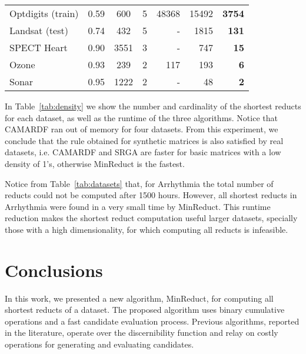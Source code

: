 \documentclass[authoryear,preprint,review,12pt]{elsarticle}
\begin{document}
\begin{table}[tb]
\begin{tabular}{lcccrrr}
			Optdigits (train)& 0.59 & 600  & 5  & 48368         & 15492          & \textbf{3754} \\
			Landsat (test)   & 0.74 & 432  & 5  &   -           & 1815           & \textbf{131}   \\
			SPECT Heart      & 0.90 & 3551 & 3  &  -            & 747            & \textbf{15}   \\
			Ozone            & 0.93 & 239  & 2  & 117           & 193            & \textbf{6}   \\
			Sonar            & 0.95 & 1222 & 2  &  -            & 48             & \textbf{2}   \\
			\hline
		\end{tabular}
	\end{table} 

	In Table~\ref{tab:density} we show the number and cardinality of the shortest reducts for each dataset, as well as the runtime of the three algorithms. Notice that CAMARDF ran out of memory for four datasets. From this experiment, we conclude that the rule obtained for synthetic matrices is also satisfied by real datasets, i.e. CAMARDF and SRGA are faster for basic matrices with a low density of 1's, otherwise MinReduct is the fastest. 

	Notice from Table~\ref{tab:datasets} that, for Arrhythmia the total number of reducts could not be computed after 1500 hours. However, all shortest reducts in Arrhythmia were found in a very small time by MinReduct. This runtime reduction makes the shortest reduct computation useful larger datasets, specially those with a high dimensionality, for which computing all reducts is infeasible.
	  
\section{Conclusions}\label{conclusions}
	In this work, we presented a new algorithm, MinReduct, for computing all shortest reducts of a dataset. The proposed algorithm uses binary cumulative operations and a fast candidate evaluation process. Previous algorithms, reported in the literature, operate over the discernibility function and relay on costly operations for generating and evaluating candidates. 
	
\end{document}
